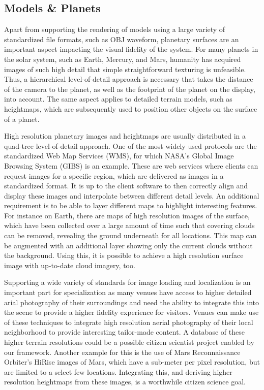 \documentclass{vgtc}                %
\begin{document}
\subsection*{Models \& Planets}
Apart from supporting the rendering of models using a large variety of standardized file formats, such as OBJ waveform, planetary surfaces are an important aspect impacting the visual fidelity of the system. For many planets in the solar system, such as Earth, Mercury, and Mars, humanity has acquired images of such high detail that simple straightforward texturing is unfeasible. Thus, a hierarchical level-of-detail approach is necessary that takes the distance of the camera to the planet, as well as the footprint of the planet on the display, into account. The same aspect applies to detailed terrain models, such as heightmaps, which are subsequently used to position other objects on the surface of a planet.

High resolution planetary images and heightmaps are usually distributed in a quad-tree level-of-detail approach. One of the most widely used protocols are the standardized Web Map Services (WMS), for which NASA's Global Image Browsing System (GIBS) is an example. These are web services where clients can request images for a specific region, which are delivered as images in a standardized format. It is up to the client software to then correctly align and display these images and interpolate between different detail levels. An additional requirement is to be able to layer different maps to highlight interesting features. For instance on Earth, there are maps of high resolution images of the surface, which have been collected over a large amount of time such that covering clouds can be removed, revealing the ground underneath for all locations. This map can be augmented with an additional layer showing only the current clouds without the background. Using this, it is possible to achieve a high resolution surface image with up-to-date cloud imagery, too.

Supporting a wide variety of standards for image loading and localization is an important part for specialization as many venues have access to higher detailed arial photography of their surroundings and need the ability to integrate this into the scene to provide a higher fidelity experience for visitors. Venues can make use of these techniques to integrate high resolution aerial photography of their local neighborhood to provide interesting tailor-made content. A database of these higher terrain resolutions could be a possible citizen scientist project enabled by our framework. Another example for this is the use of Mars Reconnaissance Orbiter's HiRise images of Mars, which have a sub-meter per pixel resolution, but are limited to a select few locations. Integrating this, and deriving higher resolution heightmaps from these images, is a worthwhile citizen science goal.
\end{document}
